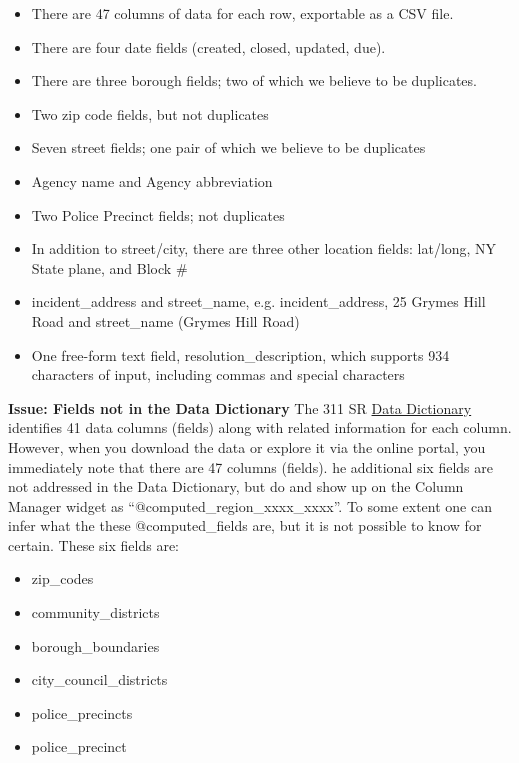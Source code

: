 \documentclass[12pt, titlepage]{article}
\begin{document}
\begin{itemize}
	\item There are 47 columns of data for each row, exportable as a CSV file.
	\item There are four date fields (created, closed, updated, due).
	\item There are three borough fields; two of which we believe to be duplicates.
	\item Two zip code fields, but not duplicates
	\item Seven street fields; one pair of which we believe to be duplicates
	\item Agency name and Agency abbreviation
	\item Two Police Precinct fields; not duplicates
	\item In addition to street/city, there are three other location fields: lat/long, NY State plane, and Block \#
	\item incident\_address and street\_name, e.g. incident\_address, 25 Grymes Hill Road and street\_name (Grymes Hill Road)
	\item One free-form text field, resolution\_description, which supports 934 characters of input, including commas and special characters
\end{itemize}


\textbf{Issue: Fields not in the Data Dictionary} The 311 SR \href{https://data.cityofnewyork.us/api/views/erm2-nwe9/files/b372b884-f86a-453b-ba16-1fe06ce9d212?download=true&filename=311_ServiceRequest_2010-Present_DataDictionary_Updated_2023.xlsx}{Data Dictionary}
 identifies 41 data columns (fields) along with related information for each column. 
 However, when you download the data or explore it via the online portal, you immediately note that there are 47 columns (fields).
 he additional six fields are not addressed in the Data Dictionary, but do and show up on the Column Manager widget
 as ``@computed\_region\_xxxx\_xxxx''. To some extent one can infer what the these @computed\_fields are, but it is not possible to know
for certain. These six fields are:

\begin{itemize}
	\item zip\_codes
	\item community\_districts
	\item borough\_boundaries
	\item city\_council\_districts
	\item police\_precincts
	\item police\_precinct 
\end{itemize}	
\end{document}
